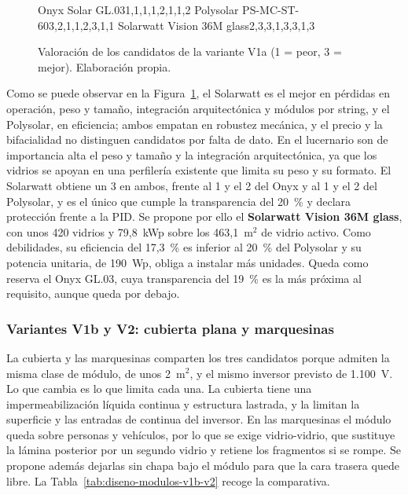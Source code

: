 \begin{figure}[htbp]
    \centering
        {Onyx Solar GL.03}{1,1,1,1,2,1,1,2}
        {Polysolar PS-MC-ST-60}{3,2,1,1,2,3,1,1}
        {Solarwatt Vision 36M glass}{2,3,3,1,3,3,1,3}
    \caption{Valoración de los candidatos de la variante V1a (1 = peor, 3 = mejor). Elaboración propia.}
    \label{fig:radar-v1a}
\end{figure}

Como se puede observar en la Figura~\ref{fig:radar-v1a}, el Solarwatt es el mejor en pérdidas en operación, peso y tamaño, integración arquitectónica y módulos por string, y el Polysolar, en eficiencia; ambos empatan en robustez mecánica, y el precio y la bifacialidad no distinguen candidatos por falta de dato. En el lucernario son de importancia alta el peso y tamaño y la integración arquitectónica, ya que los vidrios se apoyan en una perfilería existente que limita su peso y su formato. El Solarwatt obtiene un 3 en ambos, frente al 1 y el 2 del Onyx y al 1 y el 2 del Polysolar, y es el único que cumple la transparencia del 20~\% y declara protección frente a la PID. Se propone por ello el \textbf{Solarwatt Vision 36M glass}, con unos 420 vidrios y 79,8~kWp sobre los 463,1~m$^2$ de vidrio activo. Como debilidades, su eficiencia del 17,3~\% es inferior al 20~\% del Polysolar y su potencia unitaria, de 190~Wp, obliga a instalar más unidades. Queda como reserva el Onyx GL.03, cuya transparencia del 19~\% es la más próxima al requisito, aunque queda por debajo.

\subsubsection{Variantes V1b y V2: cubierta plana y marquesinas}
\label{subsubsec:diseno-modulo-v1b-v2}

La cubierta y las marquesinas comparten los tres candidatos porque admiten la misma clase de módulo, de unos 2~m$^2$, y el mismo inversor previsto de 1.100~V. Lo que cambia es lo que limita cada una. La cubierta tiene una impermeabilización líquida continua y estructura lastrada, y la limitan la superficie y las entradas de continua del inversor. En las marquesinas el módulo queda sobre personas y vehículos, por lo que se exige vidrio-vidrio, que sustituye la lámina posterior por un segundo vidrio y retiene los fragmentos si se rompe. Se propone además dejarlas sin chapa bajo el módulo para que la cara trasera quede libre. La Tabla~\ref{tab:diseno-modulos-v1b-v2} recoge la comparativa.

